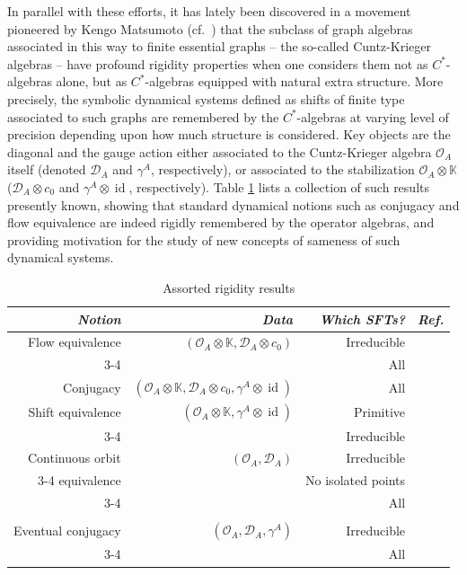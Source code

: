 \documentclass[12pt]{amsbook}%
\theoremstyle{defin}
\theoremstyle{remark}
\numberwithin{equation}{chapter}
\numberwithin{theor}{section}
\newcommand{\Oo}{\mathcal{O}}
\newcommand{\Dd}{\mathcal{D}}
\newcommand{\K}{\mathbb{K}}
\newcommand{\id}{\operatorname{id}}
\begin{document}
In parallel with these efforts, it has lately been discovered in a movement pioneered by Kengo Matsumoto (cf.~\cite{km:sdsc}) that the subclass of graph algebras associated in this way to finite essential graphs -- the so-called Cuntz-Krieger algebras -- have profound rigidity properties when one considers them not as $C^*$-algebras alone, but as $C^*$-algebras equipped with natural extra structure. More precisely, the symbolic dynamical systems defined as shifts of finite type associated to such graphs are remembered by the $C^*$-algebras at varying level of precision depending upon how much structure is considered. Key objects are the diagonal and the gauge action  either associated to the Cuntz-Krieger algebra $\Oo_A$ itself (denoted $\Dd_A$ and $\gamma^A$, respectively), or associated to the stabilization	$\Oo_A\otimes\K$  ($\Dd_A\otimes c_0 $ and $\gamma^A\otimes \id$, respectively). Table \ref{varres} %
lists a collection of such results presently known, showing that standard dynamical notions such as conjugacy and flow equivalence are indeed rigidly remembered by the operator algebras, and providing motivation for the study of new concepts of sameness of such dynamical systems.
\begin{table}[t]
\begin{center}
\begin{tabular}{r|r|r|r}
\emph{Notion}&\emph{Data}&\emph{Which SFTs?}&\emph{Ref.}\\
\hline\hline
Flow equivalence&$(\Oo_A\otimes\K,\Dd_A\otimes c_0)$&Irreducible&\cite{kmhm:coetmscka}\\\cline{3-4}
&&All&\cite{ceor:coe}\\\hline
Conjugacy&$(\Oo_A\otimes\K,\Dd_A\otimes c_0,\gamma^A\otimes\id)$&All&\cite{tmcjr:dgigc}\\\hline
Shift equivalence&$(\Oo_A\otimes\K,\gamma^A\otimes\id)$&Primitive&\cite{obak:tsacsa}\\\cline{3-4}
&&Irreducible&\cite{segs}\\\hline
Continuous orbit&$(\Oo_A,\Dd_A)$&Irreducible&\cite{km:oetmscka}\\\cline{3-4}
 equivalence&&No isolated points&\cite{nbtmcmfw:gaoe}\\\cline{3-4}
&&All&\cite{seaseer:dcdpgc}\\
&&&\cite{tmcmlw:oegigg}\\\hline
Eventual conjugacy&$(\Oo_A,\Dd_A,\gamma^A)$&Irreducible&\cite{km:ucoemsgacka}\\\cline{3-4}
&&All&\cite{tmcjr:dgigc}
\end{tabular}
\end{center}
\caption{Assorted rigidity results}\label{varres}
\end{table}
\end{document}
